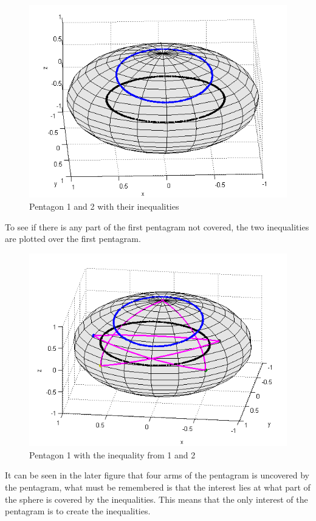 \begin{figure}[H]
\begin{center}
\includegraphics[scale=0.5]{ine12.png}
\caption{Pentagon 1 and 2 with their inequalities}
\end{center}
\end{figure}
To see if there is any part of the first pentagram not covered, the two inequalities are plotted over the first pentagram.
\begin{figure}[H]
\begin{center}
\includegraphics[scale=0.5]{penta1ine12.png}
\caption{Pentagon 1 with the inequality from 1 and 2}
\end{center}
\end{figure}
It can be seen in the later figure that four arms of the pentagram is uncovered by the pentagram, what must be remembered is that the interest lies at what part of the sphere is covered by the inequalities. This means that the only interest of the pentagram is to create the inequalities.


